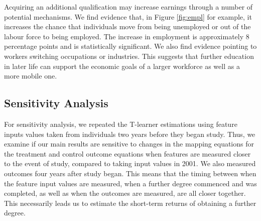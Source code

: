 \documentclass[12pt, a4paper]{article}
\begin{document}
%

Acquiring an additional qualification may increase earnings through a number of
potential mechanisms. We find evidence that, in Figure \ref{fig:empl} for
example, it increases the chance that individuals move from being unemployed or
out of the labour force to being employed. The increase in employment is
approximately 8 percentage points and is statistically significant. We also
find evidence pointing to workers switching occupations or industries. This
suggests that further education in later life can support the economic goals of
a larger workforce as well as a more mobile one.

\subsection{Sensitivity Analysis}

For sensitivity analysis, we repeated the T-learner estimations using feature
inputs values taken from individuals two years before they began study. Thus, we
examine if our main results are sensitive to changes in the mapping equations
for the treatment and control outcome equations when features are measured
closer to the event of study, compared to taking input values in 2001. We also
measured outcomes four years after study began. This means that the timing
between when the feature input values are measured, when a further degree
commenced and was completed, as well as when the outcomes are measured, are all
closer together. This necessarily leads us to estimate the short-term returns
of obtaining a further degree. 
\end{document}
